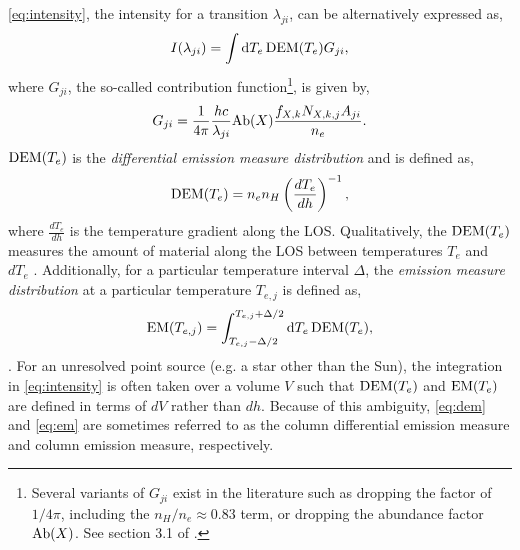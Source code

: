 \autoref{eq:intensity}, the intensity for a transition $\lambda_{ji}$, can be alternatively expressed as,
\begin{equation}\label{eq:intensity_dem}
    I(\lambda_{ji}) = \int\dd{T_e}\dem G_{ji},
\end{equation}
where $G_{ji}$, the so-called contribution function\footnote{Several variants of $G_{ji}$ exist in the literature such as dropping the factor of $1/4\pi$, including the $n_H/n_e\approx0.83$ term, or dropping the abundance factor $\textup{Ab}(X)$. See section 3.1 of \citet{del_zanna_solar_2018}.}, is given by,
\begin{equation}\label{eq:contribution_function}
    G_{ji} = \frac{1}{4\pi}\frac{hc}{\lambda_{ji}}\textup{Ab}(X)\frac{f_{X,k}N_{X,k,j}A_{ji}}{n_e}.
\end{equation}
$\dem$ is the \textit{differential emission measure distribution} and is defined as,
\begin{equation}\label{eq:dem}
    \dem = n_en_H\left(\frac{dT_e}{dh}\right)^{-1},
\end{equation}
where $\frac{dT_e}{dh}$ is the temperature gradient along the LOS. Qualitatively, the $\dem$ measures the amount of material along the LOS between temperatures $T_e$ and $dT_e$ \citep{withbroe_thermal_1978}. Additionally, for a particular temperature interval $\Delta$, the \textit{emission measure distribution} at a particular temperature $T_{e,j}$ is defined as,
\begin{equation}\label{eq:em}
    \emd[T_{e,j}] = \int_{T_{e,j} - \Delta/2}^{T_{e,j} + \Delta/2}\dd{T_e}\dem,
\end{equation}
\citep{del_zanna_solar_2018}. For an unresolved point source (e.g. a star other than the Sun), the integration in \autoref{eq:intensity} is often taken over a volume $V$ such that $\dem$ and $\emd$ are defined in terms of $dV$ rather than $dh$. Because of this ambiguity, \autoref{eq:dem} and \autoref{eq:em} are sometimes referred to as the column differential emission measure and column emission measure, respectively.

